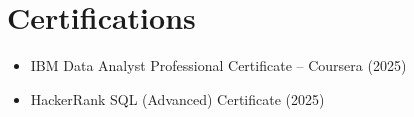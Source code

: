 \documentclass[letterpaper,11pt]{article}
\begin{document}
\section{Certifications}

\begin{itemize}
  \item IBM Data Analyst Professional Certificate -- Coursera (2025)
  \item HackerRank SQL (Advanced) Certificate (2025)
\end{itemize}
\end{document}
